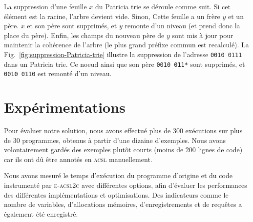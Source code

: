 La suppression d'une feuille $x$ du Patricia trie se déroule comme suit. Si cet
élément est la racine, l'arbre devient vide. Sinon, Cette feuille a un frère $y$
et un père. $x$ et son père sont supprimés, et $y$ remonte d'un niveau (et prend
donc la place du père). Enfin, les champs du nouveau père de $y$ sont mis à jour
pour maintenir la cohérence de l'arbre (le plus grand préfixe commun est
recalculé). La Fig.~\ref{fig:suppression-Patricia-trie} illustre la suppression
de l'adresse \texttt{0010\,0111} dans un Patricia trie. Ce noeud ainsi que son
père \texttt{0010\,011*} sont supprimés, et \texttt{0010\,0110} est remonté d'un
niveau.



\section{Expérimentations}


Pour évaluer notre solution, nous avons effectué plus de 300 exécutions sur
plus de 30 programmes, obtenus à partir d'une dizaine d'exemples. Nous avons
volontairement gardés des exemples plutôt courts (moins de 200 lignes de code)
car ils ont dû être annotés en \textsc{acsl} manuellement.

Nous avons mesuré le temps d'exécution du programme d'origine et du code
instrumenté par \textsc{e-acsl2c} avec différentes options, afin d'évaluer les
performances des différentes implémentations et optimisations. Des indicateurs
comme le nombre de variables, d'allocations mémoires, d'enregistrements et de
requêtes a également été enregistré.



